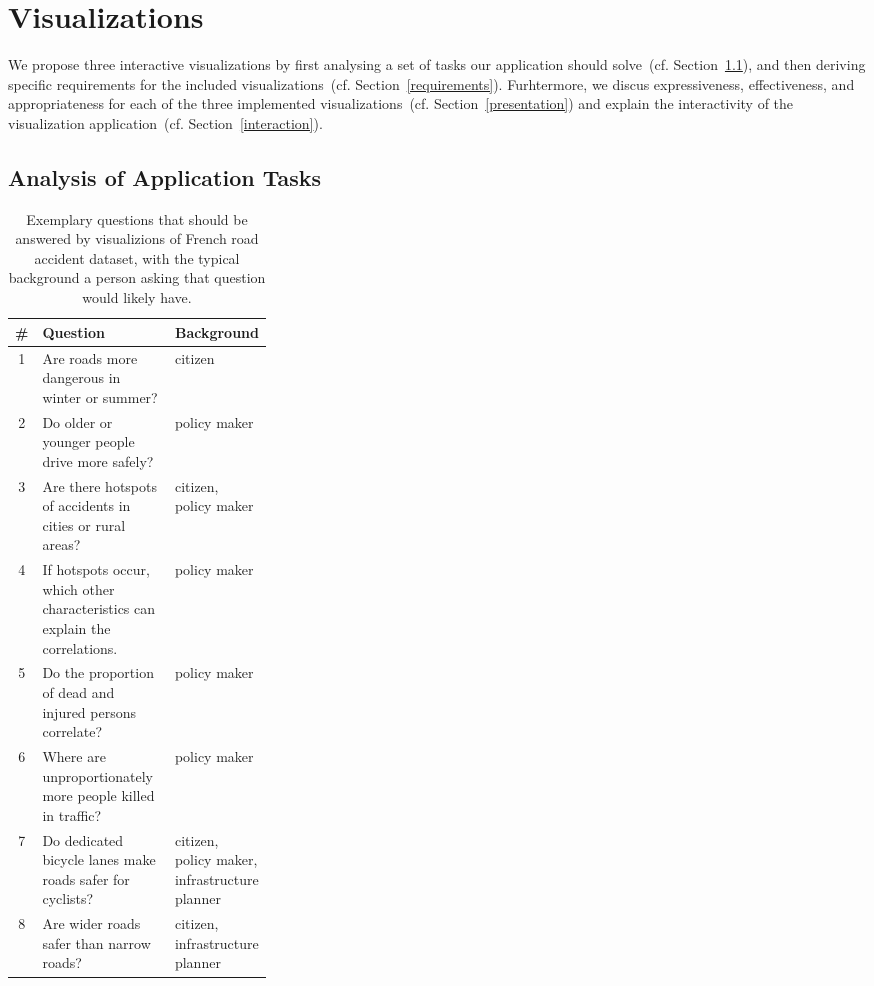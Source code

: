 \section{Visualizations}
We propose three interactive visualizations by first analysing a set of tasks our application should solve~(cf. Section~\ref{tasks}), and then deriving specific requirements for the included visualizations~(cf. Section~\ref{requirements}). Furhtermore, we discus expressiveness, effectiveness, and appropriateness for each of the three implemented visualizations~(cf. Section~\ref{presentation}) and explain the interactivity of the visualization application~(cf. Section~\ref{interaction}).

\subsection{Analysis of Application Tasks}
\label{tasks}
\begin{table}
    \caption{Exemplary questions that should be answered by visualizions of French road accident dataset, with the typical background a person asking that question would likely have.}
    \label{table-questions}
    \begin{tabularx}{\linewidth}{cXp{0.3\linewidth}}
        \toprule
        \textbf{\#} & \textbf{Question} & \textbf{Background} \\
        \midrule
        1 & Are roads more dangerous in winter or summer? & citizen \\
        2 & Do older or younger people drive more safely? & policy maker \\
        3 & Are there hotspots of accidents in cities or rural areas? & citizen, policy maker \\
        4 & If hotspots occur, which other characteristics can explain the correlations. & policy maker \\
        5 & Do the proportion of dead and injured persons correlate? & policy maker \\
        6 & Where are unproportionately more people killed in traffic? & policy maker \\
        7 & Do dedicated bicycle lanes make roads safer for cyclists? & citizen, policy maker, infrastructure planner \\
        8 & Are wider roads safer than narrow roads? & citizen, infrastructure planner \\
        \bottomrule
    \end{tabularx}
\end{table}
